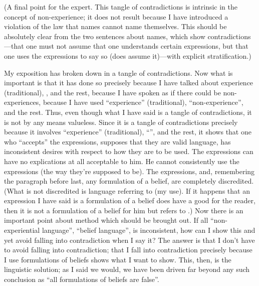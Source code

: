 (A final point for the expert. This tangle of contradictions is intrinsic in the concept of non-experience; it does not result because I have introduced a violation of the law that names cannot name themselves. This should be absolutely clear from the two sentences about names, which show contradictions---that one must not assume that one understands certain expressions, but that one uses the expressions to say so (does assume it)---with explicit stratification.) 

My exposition has broken down in a tangle of contradictions. Now what is important is that it has done so precisely because I have talked about experience (traditional), , and the rest, because I have spoken as if there could be non-experiences, because I have used \enquote{experience} (traditional), \enquote{non-experience}, and the rest. Thus, even though what I have said is a tangle of contradictions, it is not by any means valueless. Since it is a tangle of contradictions precisely because it involves \enquote{experience} (traditional), \enquote{}, and the rest, it shows that one who \enquote{accepts} the expressions, supposes that they are valid language, has inconsistent desires with respect to how they are to be used. The expressions can have no explications at all acceptable to him. He cannot consistently use the expressions (the way they're supposed to be). The expressions, and, remembering the paragraph before last, any formulation of a belief, are completely discredited. (What is not discredited is language referring to  (my use). If it happens that an expression I have said is a formulation of a belief does have a good  for the reader, then it is not a formulation of a belief for him but refers to .) Now there is an important point about method which should be brought out. If all \enquote{non-experiential language}, \enquote{belief language}, is inconsistent, how can I show this and yet avoid falling into contradiction when I say it? The answer is that I don't have to avoid falling into contradiction; that I fall into contradiction precisely because I use formulations of beliefs shows what I want to show. This, then, is the linguistic solution; as I said we would, we have been driven far beyond any such conclusion as \enquote{all formulations of beliefs are false}. 


